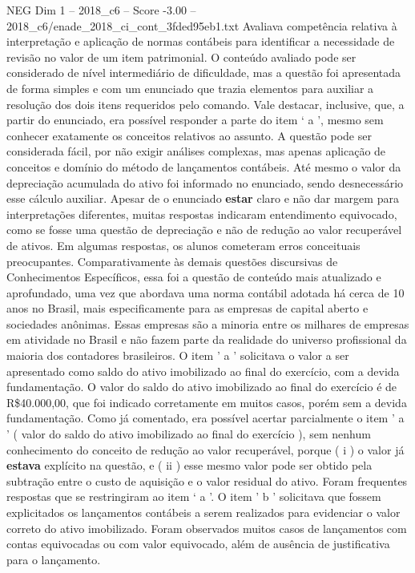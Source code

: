 \begin{textsample}{NEG Dim 1 – 2018\_c6 – Score -3.00 – 2018\_c6/enade\_2018\_ci\_cont\_3fded95eb1.txt}
Avaliava competência relativa à interpretação e aplicação de normas contábeis para identificar a necessidade de revisão no valor de um item patrimonial.
O conteúdo avaliado pode ser considerado de nível intermediário de dificuldade, mas a questão foi apresentada de forma simples e com um enunciado que trazia elementos para auxiliar a resolução dos dois itens requeridos pelo comando.
Vale destacar, inclusive, que, a partir do enunciado, era possível responder a parte do item ‘ a ’, mesmo sem conhecer exatamente os conceitos relativos ao assunto.
A questão pode ser considerada fácil, por não exigir análises complexas, mas apenas aplicação de conceitos e domínio do método de lançamentos contábeis.
Até mesmo o valor da depreciação acumulada do ativo foi informado no enunciado, sendo desnecessário esse cálculo auxiliar.
Apesar de o enunciado \textbf{estar} claro e não dar margem para interpretações diferentes, muitas respostas indicaram entendimento equivocado, como se fosse uma questão de depreciação e não de redução ao valor recuperável de ativos.
Em algumas respostas, os alunos cometeram erros conceituais preocupantes.
Comparativamente às demais questões discursivas de Conhecimentos Específicos, essa foi a questão de conteúdo mais atualizado e aprofundado, uma vez que abordava uma norma contábil adotada há cerca de 10 anos no Brasil, mais especificamente para as empresas de capital aberto e sociedades anônimas.
Essas empresas são a minoria entre os milhares de empresas em atividade no Brasil e não fazem parte da realidade do universo profissional da maioria dos contadores brasileiros.
O item ' a ' solicitava o valor a ser apresentado como saldo do ativo imobilizado ao final do exercício, com a devida fundamentação.
O valor do saldo do ativo imobilizado ao final do exercício é de R\$40.000,00, que foi indicado corretamente em muitos casos, porém sem a devida fundamentação.
Como já comentado, era possível acertar parcialmente o item ' a ' ( valor do saldo do ativo imobilizado ao final do exercício ), sem nenhum conhecimento do conceito de redução ao valor recuperável, porque ( i ) o valor já \textbf{estava} explícito na questão, e ( ii ) esse mesmo valor pode ser obtido pela subtração entre o custo de aquisição e o valor residual do ativo.
Foram frequentes respostas que se restringiram ao item ‘ a ’.
O item ' b ' solicitava que fossem explicitados os lançamentos contábeis a serem realizados para evidenciar o valor correto do ativo imobilizado.
Foram observados muitos casos de lançamentos com contas equivocadas ou com valor equivocado, além de ausência de justificativa para o lançamento.

\end{textsample}
